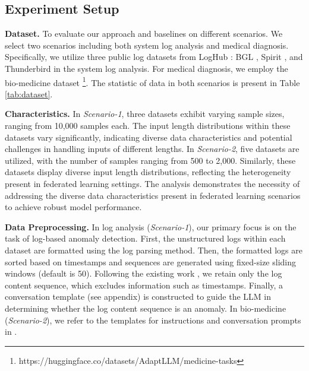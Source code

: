 \documentclass[sigconf]{acmart}
\begin{document}
\subsection{Experiment Setup}
\textbf{Dataset.} To evaluate our approach and baselines on different scenarios. We select two scenarios including both system log analysis and medical diagnosis. Specifically, we utilize three public log datasets from LogHub \cite{zhu2023loghub}: BGL \cite{oliner2007supercomputers}, Spirit \cite{stearley2008bad}, and Thunderbird \cite{oliner2007supercomputers} in the system log analysis.  For medical diagnosis, we employ the bio-medicine dataset \footnote{https://huggingface.co/datasets/AdaptLLM/medicine-tasks}. The statistic of data in both scenarios is present in Table \ref{tab:dataset}. 
\par
\textbf{Characteristics.} In \textit{Scenario-1}, three datasets exhibit varying sample sizes, ranging from 10,000 samples each. The input length distributions within these datasets vary significantly, indicating diverse data characteristics and potential challenges in handling inputs of different lengths. In \textit{Scenario-2}, five datasets are utilized, with the number of samples ranging from 500 to 2,000. Similarly, these datasets display diverse input length distributions, reflecting the heterogeneity present in federated learning settings. The analysis demonstrates the necessity of addressing the diverse data characteristics present in federated learning scenarios to achieve robust model performance.

\par
\textbf{Data Preprocessing.} In log analysis (\textit{Scenario-1}), our primary focus is on the task of log-based anomaly detection. First, the unstructured logs within each dataset are formatted using the log parsing method. Then, the formatted logs are sorted based on timestamps and sequences are generated using fixed-size sliding windows (default is 50). Following the existing work \cite{qi2023loggpt}, we retain only the log content sequence, which excludes information such as timestamps. Finally, a conversation template (see appendix) is constructed to guide the LLM in determining whether the log content sequence is an anomaly.
In bio-medicine (\textit{Scenario-2}), we refer to the templates for instructions and conversation prompts in \cite{cheng2024adapting}.
\end{document}
